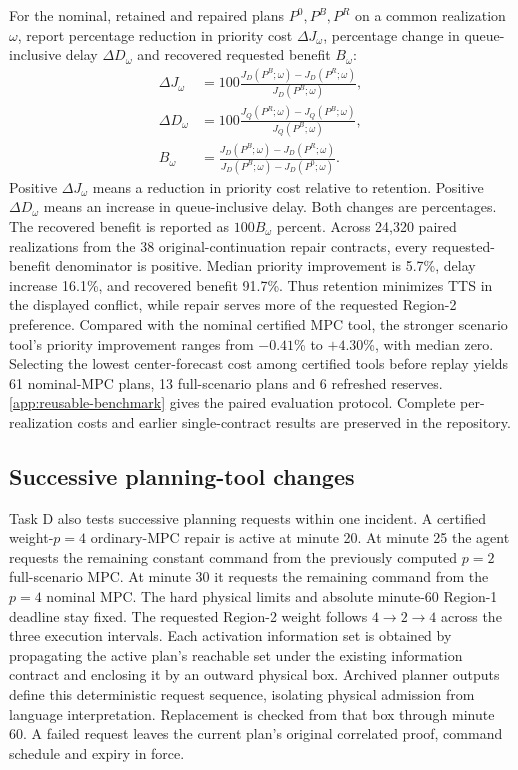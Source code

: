 \documentclass[preprint,12pt]{elsarticle}
\newcommand{\appref}[1]{\ref{#1}}
\begin{document}
For the nominal, retained and repaired plans $P^0,P^B,P^R$ on a common
realization $\omega$, report percentage reduction in priority cost $\Delta J_\omega$, percentage change in queue-inclusive delay $\Delta D_\omega$ and
recovered requested benefit $B_\omega$:
\begin{equation}
\begin{aligned}
\Delta J_\omega&=100\frac{J_D(P^B;\omega)-J_D(P^R;\omega)}{J_D(P^B;\omega)},\\
\Delta D_\omega&=100\frac{J_Q(P^R;\omega)-J_Q(P^B;\omega)}{J_Q(P^B;\omega)},\\
B_\omega&=\frac{J_D(P^B;\omega)-J_D(P^R;\omega)}{J_D(P^B;\omega)-J_D(P^0;\omega)}.
\end{aligned}
\label{eq:benchmark-repair-metrics}
\end{equation}
Positive $\Delta J_\omega$ means a reduction in priority cost relative
to retention. Positive $\Delta D_\omega$ means an increase in
queue-inclusive delay. Both changes are percentages. The recovered
benefit is reported as $100B_\omega$ percent.
Across 24,320 paired realizations from the 38 original-continuation repair
contracts, every requested-benefit denominator is positive. Median priority
improvement is 5.7\%, delay increase 16.1\%, and recovered benefit 91.7\%.
Thus retention minimizes TTS in the displayed conflict, while repair serves
more of the requested Region-2 preference. Compared with the nominal
certified MPC tool, the stronger scenario tool's priority improvement ranges
from $-0.41$\% to $+4.30$\%, with median zero. Selecting the lowest center-forecast
cost among certified tools before replay yields 61 nominal-MPC plans,
13 full-scenario plans and 6 refreshed reserves. \appref{app:reusable-benchmark}
gives the paired evaluation protocol. Complete per-realization costs and
earlier single-contract results are preserved in the repository.

\subsection{Successive planning-tool changes}
\label{sec:sequential-handover-results}

Task D also tests successive planning requests within one incident. A
certified weight-$p=4$ ordinary-MPC repair is active at minute 20. At
minute 25 the agent requests the remaining constant command from the
previously computed $p=2$ full-scenario MPC. At minute 30 it requests the
remaining command from the $p=4$ nominal MPC. The hard physical limits and
absolute minute-60 Region-1 deadline stay fixed. The requested Region-2
weight follows $4\to2\to4$ across the three execution intervals. Each
activation information set is obtained by propagating the active plan's
reachable set under the existing information contract and enclosing it
by an outward physical box.
Archived planner outputs define this deterministic request sequence, isolating
physical admission from language interpretation.
Replacement is checked from that box through minute 60. A failed request
leaves the current plan's original correlated proof, command schedule and
expiry in force.
\end{document}
